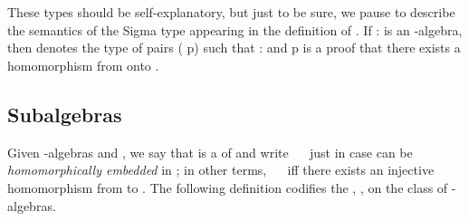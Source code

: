 \begin{code}
%
\\[\AgdaEmptyExtraSkip]%
\>[0]\AgdaSpace{}%
\AgdaSymbol{:}\AgdaSpace{}%
\AgdaSymbol{\{}\AgdaSpace{}%
\AgdaSymbol{:}\AgdaSpace{}%
\AgdaSpace{}%
\AgdaSpace{}%
\AgdaSymbol{\}}\AgdaSpace{}%
\AgdaSpace{}%
\AgdaSpace{}%
\AgdaSpace{}%
\<%
\\
\>[0]\AgdaSpace{}%
\AgdaSymbol{\{}\AgdaSpace{}%
\AgdaSymbol{=}\AgdaSpace{}%
\AgdaSymbol{\}\{}\AgdaSpace{}%
\AgdaSymbol{=}\AgdaSpace{}%
\AgdaSymbol{\}}\AgdaSpace{}%
\AgdaSymbol{=}\AgdaSpace{}%
\AgdaSpace{}%
\AgdaOperator{\AgdaInductiveConstructor{,}}\AgdaSpace{}%
\AgdaSpace{}%
\AgdaSymbol{\{}\AgdaSymbol{\}}\AgdaSpace{}%
\AgdaSpace{}%
\AgdaSpace{}%
\AgdaSpace{}%
\AgdaSpace{}%
\AgdaSpace{}%
\AgdaSpace{}%
\AgdaSpace{}%
\AgdaOperator{\AgdaFunction{𝔻[}}\AgdaSpace{}%
\AgdaSpace{}%
\AgdaOperator{\AgdaFunction{]}}\AgdaSpace{}%
\AgdaSpace{}%
\AgdaSymbol{(}\AgdaSpace{}%
\AgdaSpace{}%
\AgdaSymbol{)}\<%
\end{code}
\ifshort\else    %

\medskip

\noindent These types should be self-explanatory, but just to be sure, we pause
to describe the semantics of the Sigma type appearing in the definition of .
If  :    is an -algebra, then  
denotes the type of pairs ( \aic{,} \ab p) such that  :   
and \ab p is a proof that there exists a homomorphism from  onto .
\fi      %

\subsection{Subalgebras}
\label{subalgebras}
Given -algebras  and , we say that  is a  of
 and write ~~ just in case  can be \emph{homomorphically
embedded} in ; in other terms, ~~ iff there exists an injective
homomorphism from  to . The following definition codifies the , , on the class of -algebras.

